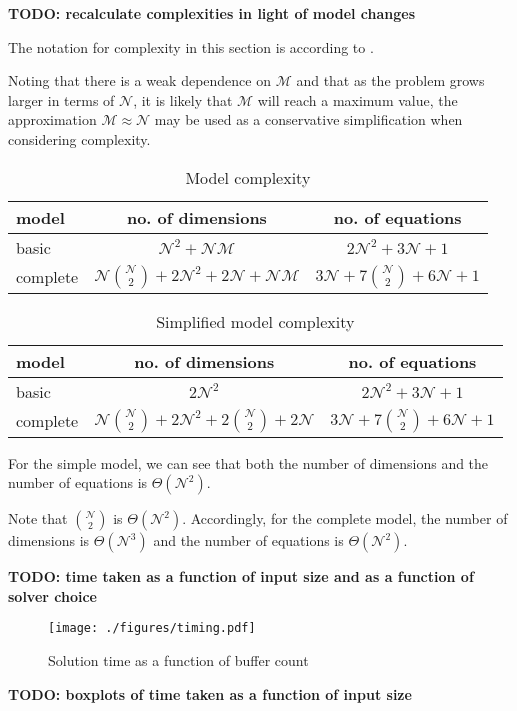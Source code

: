\textbf{TODO: recalculate complexities in light of model changes}

The notation for complexity in this section is according to \citet{Knuth:1976}.

Noting that there is a weak dependence on $\mathcal{M}$ and that as the problem
grows larger in terms of $\mathcal{N}$, it is likely that $\mathcal{M}$ will
reach a maximum value, the approximation $\mathcal{M} \approx \mathcal{N}$ may
be used as a conservative simplification when considering complexity.
\begin{table}[h!]
    \centering
    \caption{Model complexity}
    \label{tbl.complexity1}
    \begin{tabular}{l | c | c}
        model & no. of dimensions & no. of equations\\ \hline
        basic & $\mathcal{N}^2 + \mathcal{N} \mathcal{M}$
            & $2\mathcal{N}^2 + 3\mathcal{N} + 1$\\
        complete & $\mathcal{N} {{\mathcal{N}}\choose{2}}
            + 2\mathcal{N}^2 + 2\mathcal{N} +\mathcal{N} \mathcal{M}$
            & $3\mathcal{N} + 7{{\mathcal{N}}\choose{2}} + 6\mathcal{N} + 1$\\
    \end{tabular}
\end{table}
\begin{table}[h!]
    \centering
    \caption{Simplified model complexity}
    \label{tbl.complexity2}
    \begin{tabular}{l | c | c}
        model & no. of dimensions & no. of equations\\ \hline
        basic & $2\mathcal{N}^2$ & $2\mathcal{N}^2 + 3\mathcal{N} + 1$\\
        complete & $\mathcal{N} {{\mathcal{N}}\choose{2}}
            + 2\mathcal{N}^2 + 2{{\mathcal{N}}\choose{2}} + 2\mathcal{N}$
            & $3\mathcal{N} + 7{{\mathcal{N}}\choose{2}} + 6\mathcal{N} + 1$\\
    \end{tabular}
\end{table}
For the simple model, we can see that both the number of dimensions and the
number of equations is $\Theta \left( \mathcal{N}^2 \right)$.

Note that ${{\mathcal{N}}\choose{2}}$ is $\Theta \left( \mathcal{N}^2 \right)$.
Accordingly, for the complete model, the number of dimensions is 
$\Theta \left( \mathcal{N}^3 \right)$ and the number of equations is
$\Theta \left( \mathcal{N}^2 \right)$.

\textbf{TODO: time taken as a function of input size and as a function of 
    solver choice}
\begin{figure}
    \centering
    \texttt{[image: ./figures/timing.pdf]}
    \caption{Solution time as a function of buffer count}
    \label{fig.timing}
\end{figure}
    
    
\textbf{TODO: boxplots of time taken as a function of input size}
